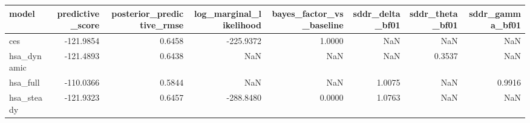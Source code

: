 \begin{tabular}{lrrrrrrr}
\toprule
model & predictive\_score & posterior\_predictive\_rmse & log\_marginal\_likelihood & bayes\_factor\_vs\_baseline & sddr\_delta\_bf01 & sddr\_theta\_bf01 & sddr\_gamma\_bf01 \\
\midrule
ces & -121.9854 & 0.6458 & -225.9372 & 1.0000 & NaN & NaN & NaN \\
hsa\_dynamic & -121.4893 & 0.6438 & NaN & NaN & NaN & 0.3537 & NaN \\
hsa\_full & -110.0366 & 0.5844 & NaN & NaN & 1.0075 & NaN & 0.9916 \\
hsa\_steady & -121.9323 & 0.6457 & -288.8480 & 0.0000 & 1.0763 & NaN & NaN \\
\bottomrule
\end{tabular}
